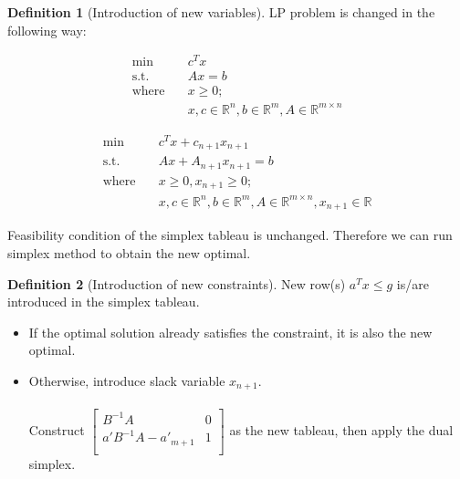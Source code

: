 \documentclass{article}
\theoremstyle{definition}
\newtheorem{definition}{Definition}[section]
\begin{document}
	\begin{definition} [Introduction of new variables]\hfill\break
	    LP problem is changed in the following way:\\
	    \begin{minipage}{.5\linewidth}
          \centering
    	    \begin{align*}	
    			\text{min} \quad& c^T x \\
    			\text{s.t.} \quad& Ax = b \\
    			\text{where} \quad& x \geq 0;\\
    			&x, c \in \mathbb{R}^n, b \in \mathbb{R}^m, A \in \mathbb{R}^{m\times n}
    		\end{align*}
        \end{minipage}
        \begin{minipage}{.5\linewidth}
          \centering
    	    \begin{align*}	
    			\text{min} \quad& c^T x + c_{n+1}x_{n+1}\\
    			\text{s.t.} \quad& Ax + A_{n+1}x_{n+1} = b \\
    			\text{where} \quad& x \geq 0, x_{n+1} \geq 0;\\
    			&x, c \in \mathbb{R}^n, b \in \mathbb{R}^m, A \in \mathbb{R}^{m\times n}, x_{n+1} \in \mathbb{R}
    		\end{align*}
        \end{minipage}
        \hfill
        
        \noindent Feasibility condition of the simplex tableau is unchanged. Therefore we can run simplex method to obtain the new optimal.
	\end{definition}
	
	\break
	\begin{definition} [Introduction of new constraints] \hfill \break
	    New row(s) $a^Tx \leq g$ is/are introduced in the simplex tableau.
	    \begin{itemize}
	        \item If the optimal solution already satisfies the constraint, it is also the new optimal.
	        \item Otherwise, introduce slack variable $x_{n+1}$.\\\\
	        Construct
	        $\begin{bmatrix}
	            B^{-1}A & 0 \\
	            a'B^{-1}A-a'_{m+1} & 1\\
	        \end{bmatrix}$
	        as the new tableau, then apply the dual simplex.
	    \end{itemize}
	\end{definition}
	
\end{document}
